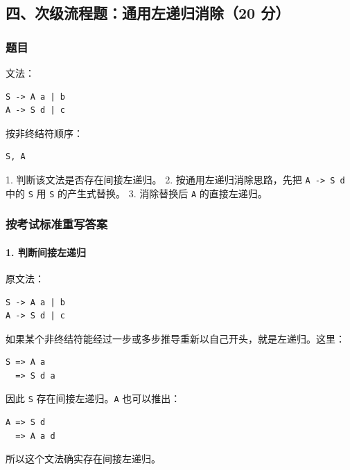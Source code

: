 \documentclass[UTF8]{ctexart}
\begin{document}
\subsection*{四、次级流程题：通用左递归消除（20 分）}

\subsubsection*{题目}

文法：

\begin{Verbatim}[fontsize=\small,breaklines=true]
S -> A a | b
A -> S d | c
\end{Verbatim}

按非终结符顺序：

\begin{Verbatim}[fontsize=\small,breaklines=true]
S, A
\end{Verbatim}

1. 判断该文法是否存在间接左递归。 2. 按通用左递归消除思路，先把 \texttt{A -> S d} 中的 \texttt{S} 用 \texttt{S} 的产生式替换。 3. 消除替换后 \texttt{A} 的直接左递归。

\subsubsection*{按考试标准重写答案}

\paragraph*{1. 判断间接左递归}

原文法：

\begin{Verbatim}[fontsize=\small,breaklines=true]
S -> A a | b
A -> S d | c
\end{Verbatim}

如果某个非终结符能经过一步或多步推导重新以自己开头，就是左递归。这里：

\begin{Verbatim}[fontsize=\small,breaklines=true]
S => A a
  => S d a
\end{Verbatim}

因此 \texttt{S} 存在间接左递归。\texttt{A} 也可以推出：

\begin{Verbatim}[fontsize=\small,breaklines=true]
A => S d
  => A a d
\end{Verbatim}

所以这个文法确实存在间接左递归。
\end{document}
